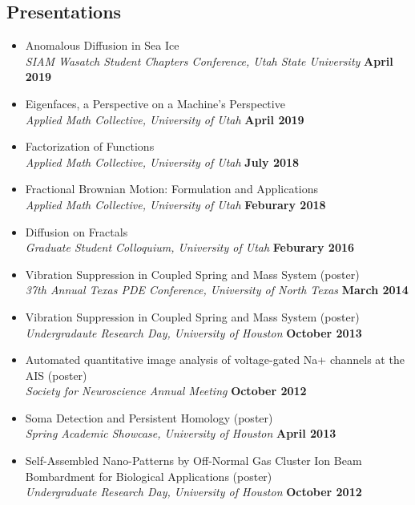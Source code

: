 \documentclass[margin,line]{res}
\begin{document}
\begin{resume}
\section{\sc Presentations}
\begin{itemize}
    \item[] Anomalous Diffusion in Sea Ice
        \\{\it SIAM Wasatch Student Chapters Conference, Utah State University} \hfill {\bf April 2019} 
    \item[] Eigenfaces, a Perspective on a Machine's Perspective
        \\{\it Applied Math Collective, University of Utah} \hfill {\bf April 2019}
    \item[] Factorization of Functions
        \\ {\it Applied Math Collective, University of Utah } \hfill {\bf July 2018} 
    \item[] Fractional Brownian Motion: Formulation and Applications
        \\ {\it Applied Math Collective, University of Utah} \hfill {\bf Feburary 2018} 
    \item[] Diffusion on Fractals
        \\ {\it Graduate Student Colloquium, University of Utah} \hfill {\bf Feburary 2016} 
    \item[] Vibration Suppression in Coupled Spring and Mass System (poster)
        \\ {\it 37th Annual Texas PDE Conference, University of North Texas} \hfill {\bf March 2014} 
    \item[] Vibration Suppression in Coupled Spring and Mass System (poster)
        \\ {\it Undergradaute Research Day, University of Houston} \hfill {\bf October 2013} 
    \item[] Automated quantitative image analysis of voltage-gated Na+ channels at the AIS (poster) 
    \\ {\it Society for Neuroscience Annual Meeting} \hfill {\bf October 2012} 
    \item[] Soma Detection and Persistent Homology (poster) 
    \\ {\it Spring Academic Showcase, University of Houston} \hfill {\bf April 2013} 
    \item[] Self-Assembled Nano-Patterns by Off-Normal Gas Cluster  Ion Beam Bombardment for Biological Applications (poster) 
    \\ {\it Undergraduate Research Day, University of Houston} \hfill {\bf October 2012} 
\end{itemize}


\end{resume}
\end{document}
